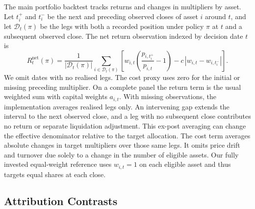 The main portfolio backtest tracks returns and changes in multipliers by asset. Let $t_i^+$ and $t_i^-$ be the next and preceding observed closes of asset $i$ around $t$, and let $\mathcal{D}_t(\pi)$ be the legs with both a recorded position under policy $\pi$ at $t$ and a subsequent observed close. The net return observation indexed by decision date $t$ is
\begin{equation}
  R^{\mathrm{net}}_t(\pi)
    =\frac{1}{|\mathcal{D}_t(\pi)|}
      \sum_{i\in\mathcal{D}_t(\pi)}\!
        \left[w_{i,t}\left(\frac{p_{i,t_i^+}}{p_{i,t}}-1\right)
            -c\,|w_{i,t}-w_{i,t_i^-}|\right].
  \label{eq:portret}
\end{equation}
We omit dates with no realised legs. The cost proxy uses zero for the initial or missing preceding multiplier. On a complete panel the return term is the usual weighted sum with capital weights $a_{i,t}$. With missing observations, the implementation averages realised legs only. An intervening gap extends the interval to the next observed close, and a leg with no subsequent close contributes no return or separate liquidation adjustment. This ex-post averaging can change the effective denominator relative to the target allocation. The cost term averages absolute changes in target multipliers over those same legs. It omits price drift and turnover due solely to a change in the number of eligible assets. Our fully invested equal-weight reference uses $w_{i,t}=1$ on each eligible asset and thus targets equal shares at each close.

\subsection{Attribution Contrasts}

